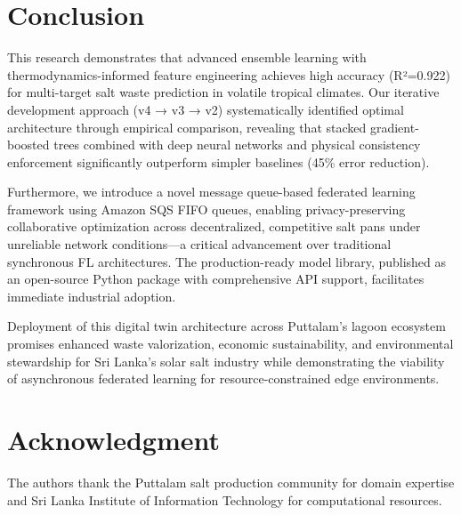 \documentclass[conference]{IEEEtran}
\begin{document}
\section{Conclusion}
This research demonstrates that advanced ensemble learning with thermodynamics-informed feature engineering achieves high accuracy (R²=0.922) for multi-target salt waste prediction in volatile tropical climates. Our iterative development approach (v4 → v3 → v2) systematically identified optimal architecture through empirical comparison, revealing that stacked gradient-boosted trees combined with deep neural networks and physical consistency enforcement significantly outperform simpler baselines (45\% error reduction). 

Furthermore, we introduce a novel message queue-based federated learning framework using Amazon SQS FIFO queues, enabling privacy-preserving collaborative optimization across decentralized, competitive salt pans under unreliable network conditions—a critical advancement over traditional synchronous FL architectures. The production-ready model library, published as an open-source Python package with comprehensive API support, facilitates immediate industrial adoption.

Deployment of this digital twin architecture across Puttalam's lagoon ecosystem promises enhanced waste valorization, economic sustainability, and environmental stewardship for Sri Lanka's solar salt industry while demonstrating the viability of asynchronous federated learning for resource-constrained edge environments.

\section*{Acknowledgment}
The authors thank the Puttalam salt production community for domain expertise and Sri Lanka Institute of Information Technology for computational resources.
\end{document}
